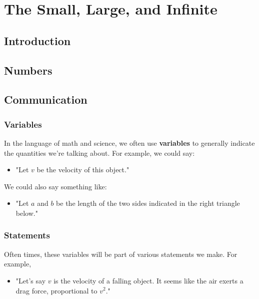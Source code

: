 
\chapter{The Small, Large, and Infinite}

\section{Introduction}



\section{Numbers}


\section{Communication}

\subsection{Variables}

In the language of math and science, we often use \textbf{variables} to generally indicate the quantities we're talking about. For example, we could say:

\begin{itemize}
\item "Let $v$ be the velocity of this object." %
\end{itemize}

We could also say something like:

\begin{itemize}
\item "Let $a$ and $b$ be the length of the two sides indicated in the right triangle below."
\end{itemize}



\subsection{Statements}

Often times, these variables will be part of various statements we make. For example, 
\begin{itemize}
\item "Let's say $v$ is the velocity of a falling object. It seems like the air exerts a drag force, proportional to $v^2$." 
\end{itemize}

